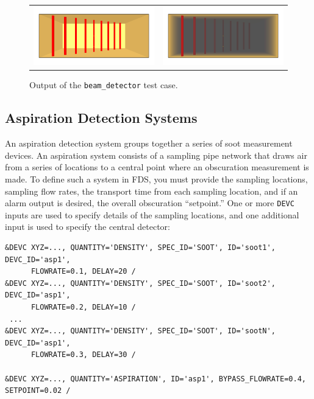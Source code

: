 \documentclass[11pt]{book}
\newcommand{\ct}{\tt\small}
\begin{document}
\begin{figure}[ht]
\begin{tabular*}{\textwidth}{lr}
\includegraphics[width=3.2in]{SCRIPT_FIGURES/beam_detector_nosmoke} &
\includegraphics[width=3.2in]{SCRIPT_FIGURES/beam_detector_smoke}
\end{tabular*}
\caption[Results of the {\ct beam\_detector} test case]{Output of the {\ct beam\_detector} test case.}
\label{beam_detector}
\end{figure}




\subsection{Aspiration Detection Systems}
\label{info:aspiration_detector}

An aspiration detection system groups together a series of soot measurement devices.
An aspiration system consists of a sampling pipe network that draws air from a series of locations to a central point
where an obscuration measurement is made.  To define such a system in FDS, you must provide the sampling locations,
sampling flow rates, the transport time from each sampling location, and if an alarm output is desired, the overall obscuration
``setpoint.''  One or more {\ct DEVC} inputs are used to specify details of the sampling locations, and one additional input is
used to specify the central detector:

\footnotesize
\begin{verbatim}
&DEVC XYZ=..., QUANTITY='DENSITY', SPEC_ID='SOOT', ID='soot1', DEVC_ID='asp1',
      FLOWRATE=0.1, DELAY=20 /
&DEVC XYZ=..., QUANTITY='DENSITY', SPEC_ID='SOOT', ID='soot2', DEVC_ID='asp1',
      FLOWRATE=0.2, DELAY=10 /
 ...
&DEVC XYZ=..., QUANTITY='DENSITY', SPEC_ID='SOOT', ID='sootN', DEVC_ID='asp1',
      FLOWRATE=0.3, DELAY=30 /

&DEVC XYZ=..., QUANTITY='ASPIRATION', ID='asp1', BYPASS_FLOWRATE=0.4, SETPOINT=0.02 /
\end{verbatim}
\normalsize
\end{document}
